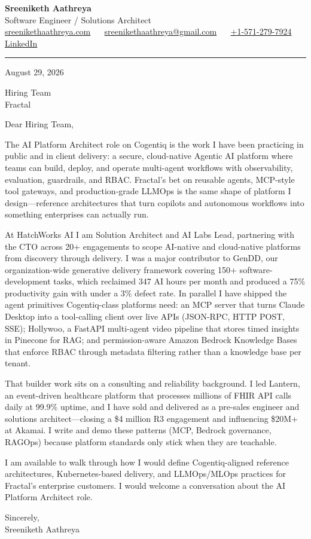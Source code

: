 \documentclass[11pt, letterpaper]{article}
\begin{document}
{\fontsize{18 pt}{20 pt}\selectfont\bfseries Sreeniketh Aathreya}\\[4pt]
Software Engineer / Solutions Architect\\[6pt]
\href{https://sreenikethaathreya.com}{sreenikethaathreya.com}
~\textbullet~
\href{mailto:sreenikethaathreya@gmail.com}{sreenikethaathreya@gmail.com}
~\textbullet~
\href{tel:+1-571-279-7924}{+1-571-279-7924}
~\textbullet~
\href{https://www.linkedin.com/in/sreeniketh-aathreya-16800b122/}{LinkedIn}

\vspace{12pt}
\hrule
\vspace{12pt}

August 29, 2026

\vspace{8pt}

Hiring Team\\
Fractal

\vspace{12pt}

Dear Hiring Team,

The AI Platform Architect role on Cogentiq is the work I have been practicing in public and in client delivery: a secure, cloud-native Agentic AI platform where teams can build, deploy, and operate multi-agent workflows with observability, evaluation, guardrails, and RBAC. Fractal's bet on reusable agents, MCP-style tool gateways, and production-grade LLMOps is the same shape of platform I design---reference architectures that turn copilots and autonomous workflows into something enterprises can actually run.

At HatchWorks AI I am Solution Architect and AI Labs Lead, partnering with the CTO across 20+ engagements to scope AI-native and cloud-native platforms from discovery through delivery. I was a major contributor to GenDD, our organization-wide generative delivery framework covering 150+ software-development tasks, which reclaimed 347 AI hours per month and produced a 75\% productivity gain with under a 3\% defect rate. In parallel I have shipped the agent primitives Cogentiq-class platforms need: an MCP server that turns Claude Desktop into a tool-calling client over live APIs (JSON-RPC, HTTP POST, SSE); Hollywoo, a FastAPI multi-agent video pipeline that stores timed insights in Pinecone for RAG; and permission-aware Amazon Bedrock Knowledge Bases that enforce RBAC through metadata filtering rather than a knowledge base per tenant.

That builder work sits on a consulting and reliability background. I led Lantern, an event-driven healthcare platform that processes millions of FHIR API calls daily at 99.9\% uptime, and I have sold and delivered as a pre-sales engineer and solutions architect---closing a \$4 million R3 engagement and influencing \$20M+ at Akamai. I write and demo these patterns (MCP, Bedrock governance, RAGOps) because platform standards only stick when they are teachable.

I am available to walk through how I would define Cogentiq-aligned reference architectures, Kubernetes-based delivery, and LLMOps/MLOps practices for Fractal's enterprise customers. I would welcome a conversation about the AI Platform Architect role.

Sincerely,\\[12pt]
Sreeniketh Aathreya
\end{document}
